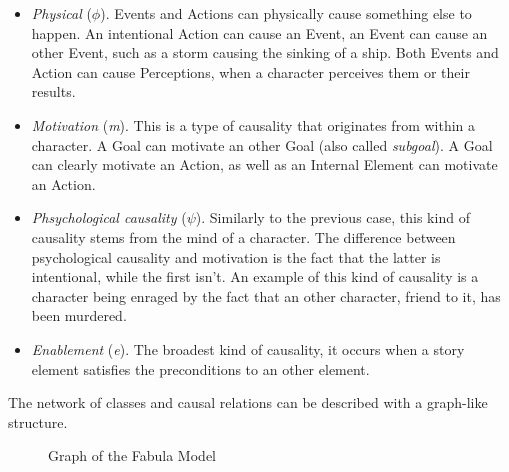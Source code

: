 \documentclass[12pt,a4paper,oneside]{report}
\begin{document}
\begin{itemize}\setlength{\itemsep}{0pt}
\item \textit{Physical} ($\phi$). Events and Actions can physically cause something else to happen. An intentional Action can cause an Event, an Event can cause an other Event, such as a storm causing the sinking of a ship. Both Events and Action can cause Perceptions, when a character perceives them or their results.
\item \textit{Motivation} (\textit{m}). This is a type of causality that originates from within a character. A Goal can motivate an other Goal (also called \textit{subgoal}). A Goal can clearly motivate an Action, as well as an Internal Element can motivate an Action.
\item \textit{Phsychological causality} ($\psi$). Similarly to the previous case, this kind of causality stems from the mind of a character. The difference between psychological causality and motivation is the fact that the latter is intentional, while the first isn't. An example of this kind of causality is a character being enraged by the fact that an other character, friend to it, has been murdered.
\item \textit{Enablement} (\textit{e}). The broadest kind of causality, it occurs when a story element satisfies the preconditions to an other element.
\end{itemize}

The network of classes and causal relations can be described with a graph-like structure.
\begin{figure}[H]
\caption{Graph of the Fabula Model}
 \label{fig:fabulamodel}
\end{figure}
\end{document}
